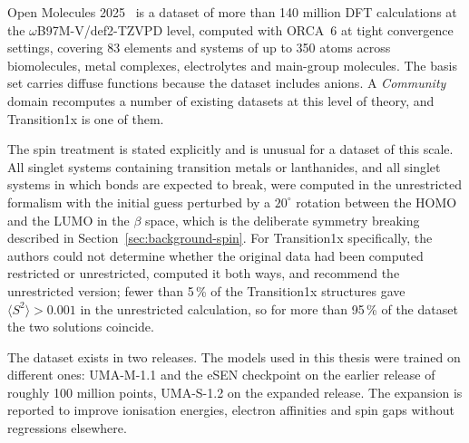 Open Molecules 2025~\cite{omol25} is a dataset of more than 140 million DFT calculations
at the \mbox{$\omega$B97M-V/def2-TZVPD} level, computed with ORCA~6 at tight convergence
settings, covering 83 elements and systems of up to 350 atoms across biomolecules, metal
complexes, electrolytes and main-group molecules. The basis set carries diffuse functions
because the dataset includes anions. A \emph{Community} domain recomputes a number of
existing datasets at this level of theory, and Transition1x is one of them.
 
The spin treatment is stated explicitly and is unusual for a dataset of this scale. All
singlet systems containing transition metals or lanthanides, and all singlet systems in
which bonds are expected to break, were computed in the unrestricted formalism with the
initial guess perturbed by a $20^\circ$ rotation between the HOMO and the LUMO in the
$\beta$ space, which is the deliberate symmetry breaking described in
Section~\ref{sec:background-spin}. For Transition1x specifically, the authors could not
determine whether the original data had been computed restricted or unrestricted,
computed it both ways, and recommend the unrestricted version; fewer than 5\,\% of the
Transition1x structures gave $\langle S^2 \rangle > 0.001$ in the unrestricted
calculation, so for more than 95\,\% of the dataset the two solutions coincide.
 
The dataset exists in two releases. The models used in this thesis were trained on
different ones: UMA-M-1.1 and the eSEN checkpoint on the earlier release of roughly 100
million points, UMA-S-1.2 on the expanded release. The expansion is reported to improve
ionisation energies, electron affinities and spin gaps without regressions elsewhere.